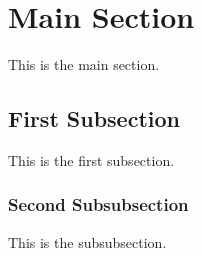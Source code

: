 \documentclass{report}
\begin{document}
	
	\section{Main Section} %
	This is the main section.
	
	\subsection{First Subsection} %
	This is the first subsection.
	
	\subsubsection{Second Subsubsection} %
	This is the subsubsection.
	
\end{document}
